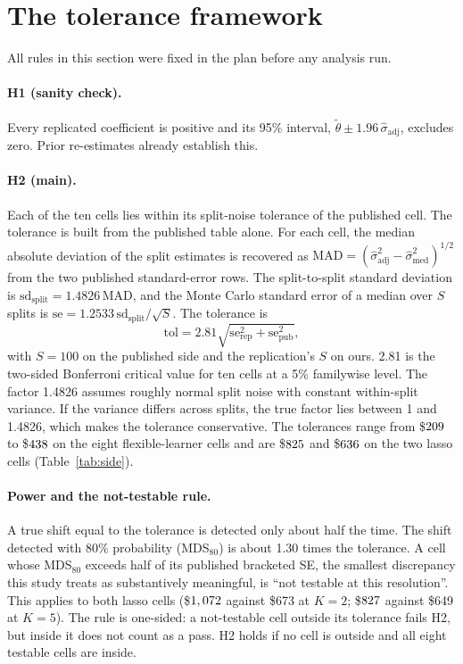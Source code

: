 \documentclass[11pt]{article}
\begin{document}
\section{The tolerance framework}
\label{sec:tolerance}

All rules in this section were fixed in the plan before any analysis run.

\paragraph{H1 (sanity check).} Every replicated coefficient is positive and its 95\%
interval, $\tilde\theta \pm 1.96\,\hat\sigma_{\text{adj}}$, excludes zero. Prior
re-estimates already establish this.

\paragraph{H2 (main).} Each of the ten cells lies within its split-noise tolerance of the
published cell. The tolerance is built from the published table alone. For each cell, the
median absolute deviation of the split estimates is recovered as
$\text{MAD} = (\hat\sigma_{\text{adj}}^2 - \hat\sigma_{\text{med}}^2)^{1/2}$ from the two
published standard-error rows. The split-to-split standard deviation is
$\text{sd}_{\text{split}} = 1.4826\,\text{MAD}$, and the Monte Carlo standard error of a
median over $S$ splits is $\text{se} = 1.2533\,\text{sd}_{\text{split}}/\sqrt{S}$. The
tolerance is
\begin{equation}
  \text{tol} = 2.81 \sqrt{\text{se}_{\text{rep}}^2 + \text{se}_{\text{pub}}^2},
  \label{eq:tol}
\end{equation}
with $S = 100$ on the published side and the replication's $S$ on ours. 2.81 is the
two-sided Bonferroni critical value for ten cells at a 5\% familywise level. The factor
1.4826 assumes roughly normal split noise with constant within-split variance. If the
variance differs across splits, the true factor lies between 1 and 1.4826, which makes the
tolerance conservative. The tolerances range from \$$209$ to
\$$438$ on the eight flexible-learner cells and are \$$825$ and
\$$636$ on the two lasso cells (Table~\ref{tab:side}).

\paragraph{Power and the not-testable rule.} A true shift equal to the tolerance is
detected only about half the time. The shift detected with 80\% probability (MDS$_{80}$)
is about 1.30 times the tolerance. A cell whose MDS$_{80}$ exceeds half of its published
bracketed SE, the smallest discrepancy this study treats as substantively meaningful, is
``not testable at this resolution''. This applies to both lasso cells
(\$$1,072$ against \$673 at $K = 2$; \$$827$ against \$649 at $K = 5$).
The rule is one-sided: a not-testable cell outside its tolerance fails H2, but inside it
does not count as a pass. H2 holds if no cell is outside and all eight testable cells are
inside.
\end{document}
